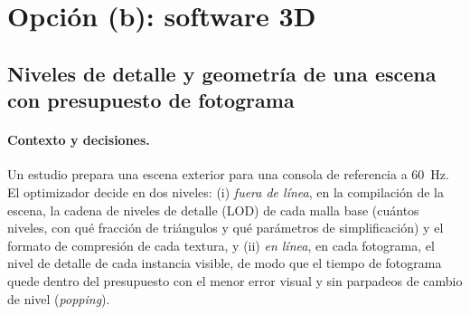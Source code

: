 \section{Opción (b): software 3D}
\label{sec:proy-b}

\subsection*{Niveles de detalle y geometría de una escena con presupuesto de fotograma}

\paragraph{Contexto y decisiones.} Un estudio prepara una escena exterior para una consola de referencia a 60~Hz. El optimizador decide en dos niveles: (i) \emph{fuera de línea}, en la compilación de la escena, la cadena de niveles de detalle (LOD) de cada malla base (cuántos niveles, con qué fracción de triángulos y qué parámetros de simplificación) y el formato de compresión de cada textura, y (ii) \emph{en línea}, en cada fotograma, el nivel de detalle de cada instancia visible, de modo que el tiempo de fotograma quede dentro del presupuesto con el menor error visual y sin parpadeos de cambio de nivel (\emph{popping}).

